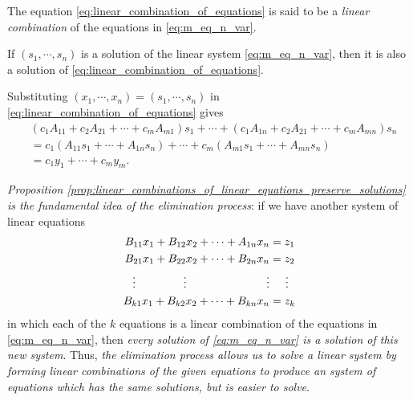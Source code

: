 \documentclass[12pt,letterpaper,reqno]{article}
\numberwithin{equation}{section}
\newcommand{\ti}[1]{\textit{#1}}
\begin{document}
\begin{defn}\label{eq:linear_combination_of_equations}
The equation \eqref{eq:linear_combination_of_equations} is said to be a \ti{linear combination} of the equations in \eqref{eq:m_eq_n_var}.
\end{defn}

\begin{prop}\label{prop:linear_combinations_of_linear_equations_preserve_solutions}
If $(s_1,\cdots,s_n)$ is a solution of the linear system \eqref{eq:m_eq_n_var}, then it is also a solution of \eqref{eq:linear_combination_of_equations}.	
\end{prop}

\begin{pf}
	Substituting $(x_1,\cdots,x_n)=(s_1,\cdots,s_n)$ in \eqref{eq:linear_combination_of_equations} gives
\begin{align*}
	&(c_1A_{11}+c_2A_{21}+\cdots+c_mA_{m1})s_1+\cdots+(c_1A_{1n}+c_2A_{21}+\cdots+c_mA_{mn})s_n  \\
	&=c_1(A_{11}s_1+\cdots + A_{1n}s_n)+\cdots + c_m(A_{m1}s_1+\cdots + A_{mn}s_n) \\
	&= c_1y_1 + \cdots + c_my_m.
\end{align*}
\end{pf}

\ti{Proposition \ref{prop:linear_combinations_of_linear_equations_preserve_solutions} is the fundamental idea of the elimination process}: if we have another system of linear equations
	\begin{equation}\label{eq:another_system}
\begin{split}
	B_{11}x_1+B_{12}x_2+\cdots + A_{1n}x_n &=z_1 \\
	B_{21}x_1+B_{22}x_2+\cdots + B_{2n}x_n &=z_2 \\
	\vdots \hspace{1.5cm} \vdots \hspace{2.5cm} \vdots & \hspace{0.5cm}\vdots  \\
	B_{k1}x_1+B_{k2}x_2+\cdots + B_{kn}x_n &=z_k \\
\end{split}
\end{equation}
in which each of the $k$ equations is a linear combination of the equations in \eqref{eq:m_eq_n_var}, then \emph{every solution of \eqref{eq:m_eq_n_var} is a solution of this new system}. 
Thus, \ti{the elimination process allows us to solve a linear system by forming linear combinations of the given equations to produce an system of equations which has the same solutions, but is easier to solve}. 
\end{document}
